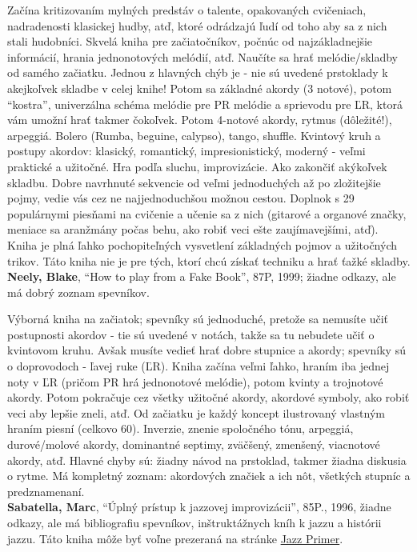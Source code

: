 \documentclass[11pt,a4paper]{book}
\begin{document}
Začína kritizovaním mylných predstáv o talente, opakovaných cvičeniach, nadradenosti klasickej hudby, atď, ktoré odrádzajú ľudí od toho aby sa z nich stali hudobníci. Skvelá kniha pre začiatočníkov, počnúc od najzákladnejšie informácií, hrania jednonotových melódií, atď. Naučíte sa hrať melódie/skladby od samého začiatku. Jednou z hlavných chýb je - nie sú uvedené prstoklady k akejkoľvek skladbe v celej knihe! Potom sa základné akordy (3 notové), potom “kostra”, univerzálna schéma melódie pre PR melódie a sprievodu pre ĽR, ktorá vám umožní hrať takmer čokoľvek. Potom 4-notové akordy, rytmus (dôležité!), arpeggiá. Bolero (Rumba, beguine, calypso), tango, shuffle. Kvintový kruh a postupy akordov: klasický, romantický, impresionistický, moderný - veľmi praktické a užitočné. Hra podľa sluchu, improvizácie. Ako zakončiť akýkoľvek skladbu. Dobre navrhnuté sekvencie od veľmi jednoduchých až po zložitejšie pojmy, vedie vás cez ne najjednoduchšou možnou cestou. Doplnok s 29 populárnymi piesňami na cvičenie a učenie sa z nich (gitarové a organové značky, meniace sa aranžmány počas behu, ako robiť veci ešte zaujímavejšími, atď). Kniha je plná ľahko pochopiteľných vysvetlení základných pojmov a užitočných trikov. Táto kniha nie je pre tých, ktorí chcú získať techniku a hrať ťažké skladby.
\medskip\\
\textbf{Neely, Blake}, “How to play from a Fake Book”, 87P, 1999; žiadne odkazy, ale má dobrý zoznam spevníkov. 

Výborná kniha na začiatok; spevníky sú jednoduché, pretože sa nemusíte učiť postupnosti akordov - tie sú uvedené v notách, takže sa tu nebudete učiť o kvintovom kruhu. Avšak musíte vedieť hrať dobre stupnice a akordy; spevníky sú o doprovodoch - ľavej ruke (ĽR). Kniha začína veľmi ľahko, hraním iba jednej noty v ĽR (pričom PR hrá jednonotové melódie), potom kvinty a trojnotové akordy. Potom pokračuje cez všetky užitočné akordy, akordové symboly, ako robiť veci aby lepšie zneli, atď. Od začiatku je každý koncept ilustrovaný vlastným hraním piesní (celkovo 60). Inverzie, znenie spoločného tónu, arpeggiá, durové/molové akordy, dominantné septimy, zväčšený, zmenšený, viacnotové akordy, atď. Hlavné chyby sú: žiadny návod na prstoklad, takmer žiadna diskusia o rytme. Má kompletný zoznam: akordových značiek a ich nôt, všetkých stupníc a predznamenaní.
\medskip\\
\textbf{Sabatella, Marc}, “Úplný prístup k jazzovej improvizácii”, 85P., 1996, žiadne odkazy, ale má bibliografiu spevníkov, inštruktážnych kníh k jazzu a histórii jazzu. Táto kniha môže byť voľne prezeraná na stránke \href{http://www.outsideshore.com/music/a-jazz-improvisation-primer/}{Jazz Primer}.
\end{document}

